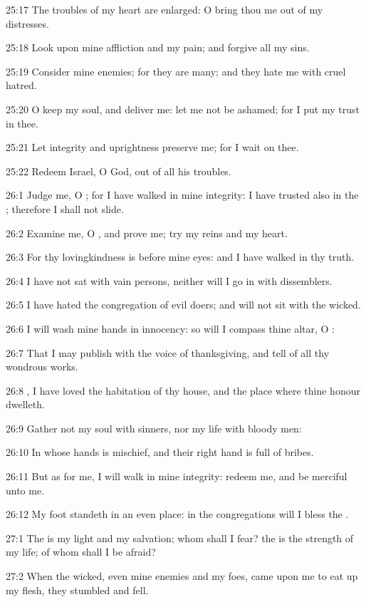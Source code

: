 25:17 The troubles of my heart are enlarged: O bring thou me out of my distresses.

25:18 Look upon mine affliction and my pain; and forgive all my sins.

25:19 Consider mine enemies; for they are many; and they hate me with cruel hatred.

25:20 O keep my soul, and deliver me: let me not be ashamed; for I put my trust in thee.

25:21 Let integrity and uprightness preserve me; for I wait on thee.

25:22 Redeem Israel, O God, out of all his troubles.



26:1 Judge me, O \LORD; for I have walked in mine integrity: I have trusted also in the \LORD; therefore I shall not slide.

26:2 Examine me, O \LORD, and prove me; try my reins and my heart.

26:3 For thy lovingkindness is before mine eyes: and I have walked in thy truth.

26:4 I have not sat with vain persons, neither will I go in with dissemblers.

26:5 I have hated the congregation of evil doers; and will not sit with the wicked.

26:6 I will wash mine hands in innocency: so will I compass thine altar, O \LORD:

26:7 That I may publish with the voice of thanksgiving, and tell of all thy wondrous works.

26:8 \LORD, I have loved the habitation of thy house, and the place where thine honour dwelleth.

26:9 Gather not my soul with sinners, nor my life with bloody men:

26:10 In whose hands is mischief, and their right hand is full of bribes.

26:11 But as for me, I will walk in mine integrity: redeem me, and be merciful unto me.

26:12 My foot standeth in an even place: in the congregations will I bless the \LORD.



27:1 The \LORD is my light and my salvation; whom shall I fear? the \LORD is the strength of my life; of whom shall I be afraid?

27:2 When the wicked, even mine enemies and my foes, came upon me to eat up my flesh, they stumbled and fell.

